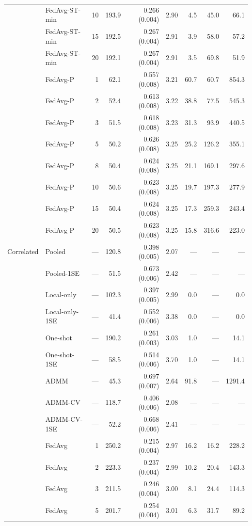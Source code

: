 \begin{longtable}{llrrrrrrr}
 & FedAvg-ST-min & 10 & 193.9 & 0.266 (0.004) & 2.90 & 4.5 & 45.0 & 66.1 \\
 & FedAvg-ST-min & 15 & 192.5 & 0.267 (0.004) & 2.91 & 3.9 & 58.0 & 57.2 \\
 & FedAvg-ST-min & 20 & 192.1 & 0.267 (0.004) & 2.91 & 3.5 & 69.8 & 51.9 \\
 & FedAvg-P & 1 & 62.1 & 0.557 (0.008) & 3.21 & 60.7 & 60.7 & 854.3 \\
 & FedAvg-P & 2 & 52.4 & 0.613 (0.008) & 3.22 & 38.8 & 77.5 & 545.3 \\
 & FedAvg-P & 3 & 51.5 & 0.618 (0.008) & 3.23 & 31.3 & 93.9 & 440.5 \\
 & FedAvg-P & 5 & 50.2 & 0.626 (0.008) & 3.25 & 25.2 & 126.2 & 355.1 \\
 & FedAvg-P & 8 & 50.4 & 0.624 (0.008) & 3.25 & 21.1 & 169.1 & 297.6 \\
 & FedAvg-P & 10 & 50.6 & 0.623 (0.008) & 3.25 & 19.7 & 197.3 & 277.9 \\
 & FedAvg-P & 15 & 50.4 & 0.624 (0.008) & 3.25 & 17.3 & 259.3 & 243.4 \\
 & FedAvg-P & 20 & 50.5 & 0.623 (0.008) & 3.25 & 15.8 & 316.6 & 223.0 \\
\midrule
Correlated & Pooled & --- & 120.8 & 0.398 (0.005) & 2.07 & --- & --- & --- \\
 & Pooled-1SE & --- & 51.5 & 0.673 (0.006) & 2.42 & --- & --- & --- \\
 & Local-only & --- & 102.3 & 0.397 (0.005) & 2.99 & 0.0 & --- & 0.0 \\
 & Local-only-1SE & --- & 41.4 & 0.552 (0.006) & 3.38 & 0.0 & --- & 0.0 \\
 & One-shot & --- & 190.2 & 0.261 (0.003) & 3.03 & 1.0 & --- & 14.1 \\
 & One-shot-1SE & --- & 58.5 & 0.514 (0.006) & 3.70 & 1.0 & --- & 14.1 \\
 & ADMM & --- & 45.3 & 0.697 (0.007) & 2.64 & 91.8 & --- & 1291.4 \\
 & ADMM-CV & --- & 118.7 & 0.406 (0.006) & 2.08 & --- & --- & --- \\
 & ADMM-CV-1SE & --- & 52.2 & 0.668 (0.006) & 2.41 & --- & --- & --- \\
 & FedAvg & 1 & 250.2 & 0.215 (0.004) & 2.97 & 16.2 & 16.2 & 228.2 \\
 & FedAvg & 2 & 223.3 & 0.237 (0.004) & 2.99 & 10.2 & 20.4 & 143.3 \\
 & FedAvg & 3 & 211.5 & 0.246 (0.004) & 3.00 & 8.1 & 24.4 & 114.3 \\
 & FedAvg & 5 & 201.7 & 0.254 (0.004) & 3.01 & 6.3 & 31.7 & 89.2 \\

\end{longtable}
